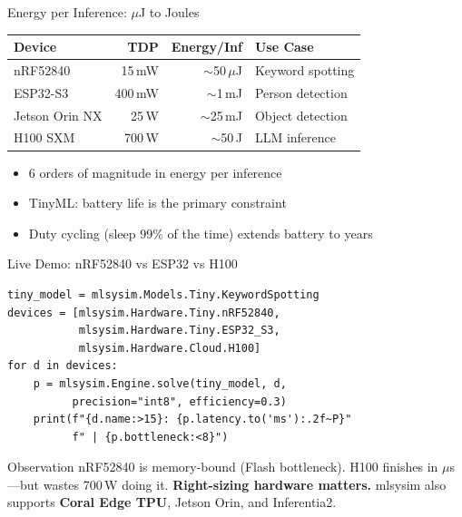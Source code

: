 \documentclass[aspectratio=169, 12pt]{beamer}
\begin{document}
\begin{frame}{Energy per Inference: $\mu$J to Joules}
\centering
\begin{tabular}{lrrl}
\toprule
\textbf{Device} & \textbf{TDP} & \textbf{Energy/Inf} & \textbf{Use Case} \\
\midrule
nRF52840       & 15\,mW  & $\sim$50\,$\mu$J & Keyword spotting \\
ESP32-S3       & 400\,mW & $\sim$1\,mJ      & Person detection \\
Jetson Orin NX & 25\,W   & $\sim$25\,mJ     & Object detection \\
\rowcolor{gray!15}
H100 SXM       & 700\,W  & $\sim$50\,J      & LLM inference \\
\bottomrule
\end{tabular}

\vspace{1em}
\begin{itemize}
  \item 6 orders of magnitude in energy per inference
  \item TinyML: battery life is the primary constraint
  \item Duty cycling (sleep 99\% of the time) extends battery to years
\end{itemize}
\end{frame}

\begin{frame}[fragile]{Live Demo: nRF52840 vs ESP32 vs H100}
\begin{lstlisting}
tiny_model = mlsysim.Models.Tiny.KeywordSpotting
devices = [mlsysim.Hardware.Tiny.nRF52840,
           mlsysim.Hardware.Tiny.ESP32_S3,
           mlsysim.Hardware.Cloud.H100]
for d in devices:
    p = mlsysim.Engine.solve(tiny_model, d,
          precision="int8", efficiency=0.3)
    print(f"{d.name:>15}: {p.latency.to('ms'):.2f~P}"
          f" | {p.bottleneck:<8}")
\end{lstlisting}

\vspace{0.3em}
\begin{exampleblock}{Observation}
nRF52840 is memory-bound (Flash bottleneck).
H100 finishes in $\mu$s---but wastes 700\,W doing it.
\textbf{Right-sizing hardware matters.}
mlsysim also supports \textbf{Coral Edge TPU}, Jetson Orin, and Inferentia2.
\end{exampleblock}
\end{frame}
\end{document}
